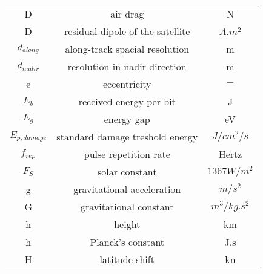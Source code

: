 \begin{center}
\begin{longtable}{c|c|c}
D																		& air drag 																																& N \\

D                                		& residual dipole of the satellite               													& $A.m^2$ \\

$d_{along}$                       	& along-track spacial resolution                  												& m \\

$d_{nadir}$                         & resolution in nadir direction                 													& m \\

e 																	& eccentricity 																														& $-$ \\

$E_b$                               & received energy per bit                  																& J \\

$E_g$                               & energy gap                                 															& eV \\

$E_{p,damage}$                      & standard damage treshold energy            															& $J/cm^2/s$ \\

$f_{rep}$                     			& pulse repetition rate                   																& Hertz \\

$F_S$                           		& solar constant                            															& $1367 W/m^2$ \\

g 																	& gravitational acceleration 																							& $m/s^2$ \\

G                                   & gravitational constant                      														& $m^3/{kg.s^2}$ \\

h                                   & height                                      														& km \\

h                                   & Planck's constant                           														& J.s \\

H                                   & latitude shift                            															& kn \\


\end{longtable}
\end{center}
